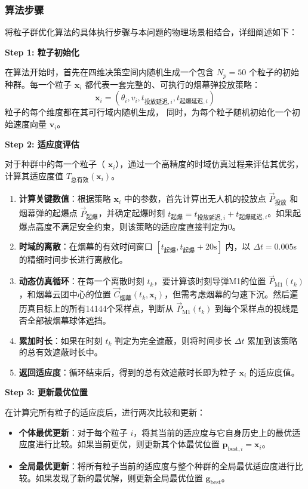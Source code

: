 \documentclass[5pt, withoutpreface,bwprint]{cumcmthesis} %
\begin{document}
    \subsubsection{算法步骤}
    将粒子群优化算法的具体执行步骤与本问题的物理场景相结合，详细阐述如下：
    
    \textbf{Step 1: 粒子初始化}
        
        在算法开始时，首先在四维决策空间内随机生成一个包含 $N_p=50$ 个粒子的初始种群。每一个粒子 $\mathbf{x}_i$ 都代表一套完整的、可执行的烟幕弹投放策略：
        \[ \mathbf{x}_i = (\theta_i, v_i, t_{\text{投放延迟},i}, t_{\text{起爆延迟},i}) \]
        粒子的每个维度都在其可行域内随机生成，
        同时，为每个粒子随机初始化一个初始速度向量 $\mathbf{v}_i$。
    
         \textbf{Step 2: 适应度评估}
        
        对于种群中的每一个粒子（ $\mathbf{x}_i$），通过一个高精度的时域仿真过程来评估其优劣，计算其适应度值 $T_{\text{总有效}}(\mathbf{x}_i)$。
        \begin{enumerate}
            \item \textbf{计算关键数值}：根据策略 $\mathbf{x}_i$ 中的参数，首先计算出无人机的投放点 $\vec{P}_{\text{投放}}$ 和烟幕弹的起爆点 $\vec{P}_{\text{起爆}}$，并确定起爆时刻 $t_{\text{起爆}} = t_{\text{投放延迟},i} + t_{\text{起爆延迟},i}$。如果起爆点高度不满足安全约束，则该策略的适应度直接判定为0。
            \item \textbf{时域的离散}：在烟幕的有效时间窗口 $[t_{\text{起爆}}, t_{\text{起爆}} + 20\text{s}]$ 内，以 $\Delta t = 0.005$s 的精细时间步长进行离散化。
            \item \textbf{动态仿真循环}：在每一个离散时刻 $t_k$，要计算该时刻导弹M1的位置 $\vec{P}_{\text{M1}}(t_k)$，和烟幕云团中心的位置 $\vec{C}_{\text{烟幕}}(t_k, \mathbf{x}_i)$，但需考虑烟幕的匀速下沉。然后遍历真目标上的所有14144个采样点，判断从 $\vec{P}_{\text{M1}}(t_k)$ 到每个采样点的视线是否全部被烟幕球体遮挡。
            
            \item \textbf{累加时长}：如果在时刻 $t_k$ 判定为完全遮蔽，则将时间步长 $\Delta t$ 累加到该策略的总有效遮蔽时长中。
            \item \textbf{返回适应度}：循环结束后，得到的总有效遮蔽时长即为粒子 $\mathbf{x}_i$ 的适应度值。
        \end{enumerate}
    
        \textbf{Step 3: 更新最优位置 }
        
        在计算完所有粒子的适应度后，进行两次比较和更新：
        \begin{itemize}
            \item \textbf{个体最优更新}：对于每个粒子 $i$，将其当前的适应度与它自身历史上的最优适应度进行比较。如果当前更优，则更新其个体最优位置 $\mathbf{p}_{\text{best},i} = \mathbf{x}_i$。
            \item \textbf{全局最优更新}：将所有粒子当前的适应度与整个种群的全局最优适应度进行比较。如果发现了新的最优解，则更新全局最优位置 $\mathbf{g}_{\text{best}}$。
        \end{itemize}
    
\end{document}
